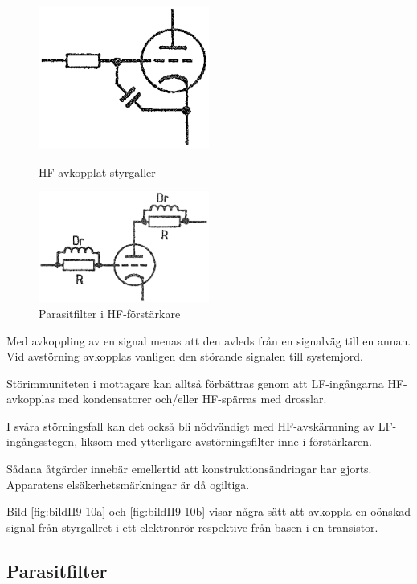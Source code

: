 \begin{figure}
  \includegraphics[width=0.5\textwidth]{images/cropped_pdfs/bild_2_9-10a.pdf}
  \caption{HF-avkopplat styrgaller}
  \label{fig:bildII9-10a}

  \includegraphics[width=0.5\textwidth]{images/cropped_pdfs/bild_2_9-11.pdf}
  \caption{Parasitfilter i HF-förstärkare}
  \label{fig:bildII9-11}
\end{figure}

Med avkoppling av en signal menas att den avleds från en signalväg
till en annan. Vid avstörning avkopplas vanligen den störande
signalen till systemjord.

Störimmuniteten i mottagare kan alltså förbättras genom att LF-ingångarna
HF-avkopplas med kondensatorer och/eller HF-spärras med drosslar.

I svåra störningsfall kan det också bli nödvändigt med HF-avskärmning
av LF-ingångsstegen, liksom med ytterligare avstörningsfilter inne i
förstärkaren.

Sådana åtgärder innebär emellertid att konstruktionsändringar har
gjorts. Apparatens elsäkerhetsmärkningar är då ogiltiga.

Bild \ref{fig:bildII9-10a} och \ref{fig:bildII9-10b} visar några sätt att avkoppla en oönskad signal från styrgallret i ett elektronrör respektive från basen i en
transistor.

\subsection{Parasitfilter}

